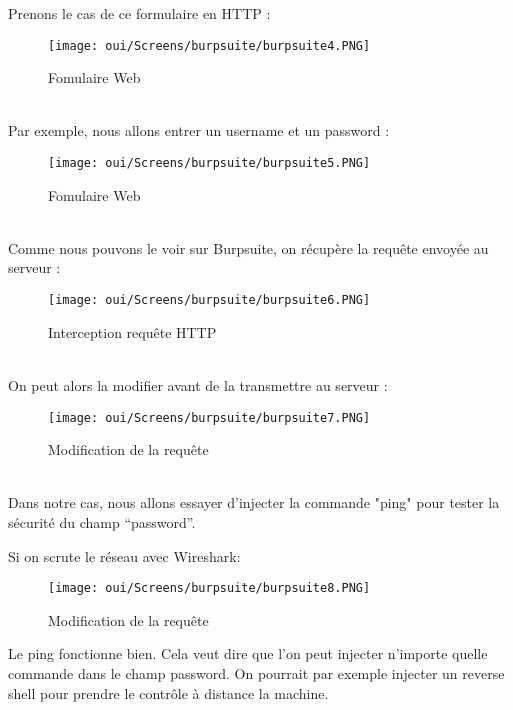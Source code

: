 \newpage
\noindent Prenons le cas de ce formulaire en HTTP :
\begin{figure}[htp!]
  \centering
  \setlength\figureheight{7cm}
  \setlength\figurewidth{9cm}
  \texttt{[image: oui/Screens/burpsuite/burpsuite4.PNG]}
  \caption{Fomulaire Web}
  \label{fig:courbe-tikz}
\end{figure}\\
\noindent Par exemple, nous allons entrer un username et un password :
\begin{figure}[htp!]
  \centering
  \setlength\figureheight{7cm}
  \setlength\figurewidth{9cm}
  \texttt{[image: oui/Screens/burpsuite/burpsuite5.PNG]}
  \caption{Fomulaire Web}
  \label{fig:courbe-tikz}
\end{figure}\\
Comme nous pouvons le voir sur Burpsuite, on récupère la requête envoyée au serveur :
\newpage
\begin{figure}[htp!]
  \centering
  \setlength\figureheight{7cm}
  \setlength\figurewidth{9cm}
  \texttt{[image: oui/Screens/burpsuite/burpsuite6.PNG]}
  \caption{Interception requête HTTP}
  \label{fig:courbe-tikz}
\end{figure}\\
\noindent On peut alors la modifier avant de la transmettre au serveur :
\begin{figure}[htp!]
  \centering
  \setlength\figureheight{7cm}
  \setlength\figurewidth{9cm}
  \texttt{[image: oui/Screens/burpsuite/burpsuite7.PNG]}
  \caption{Modification de la requête}
  \label{fig:courbe-tikz}
\end{figure}\\
Dans notre cas, nous allons essayer d’injecter la commande "ping" pour tester la sécurité du champ “password”.\\

\newpage

\noindent Si on scrute le réseau avec Wireshark:
\begin{figure}[htp!]
  \centering
  \setlength\figureheight{7cm}
  \setlength\figurewidth{9cm}
  \texttt{[image: oui/Screens/burpsuite/burpsuite8.PNG]}
  \caption{Modification de la requête}
  \label{fig:courbe-tikz}
\end{figure}

Le ping fonctionne bien. Cela veut dire que l'on peut injecter n’importe quelle commande dans le champ password. On pourrait par exemple injecter un reverse shell pour prendre le contrôle à distance la machine.

